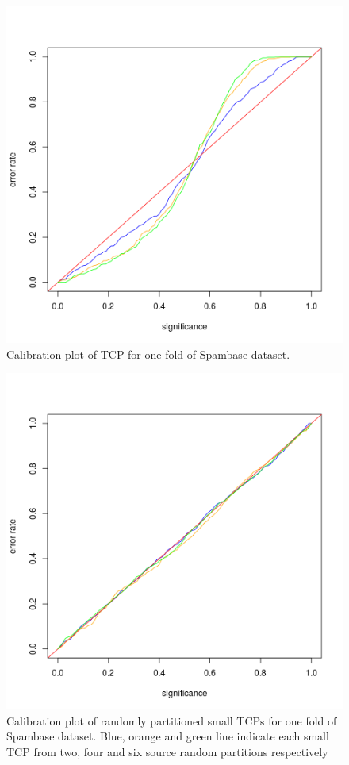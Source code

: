 \documentclass[main]{subfiles}
\begin{document}
\begin{figure}[H]
\begin{center}
  \includegraphics[scale=0.3]{images/eqSourceCombined}
 \caption{Calibration plot of TCP for one fold of Spambase dataset.}
 \label{fig:pooledCalibrationPlot}
\end{center}
\end{figure}

\begin{figure}[H]
\begin{center}
  \includegraphics[scale=0.6]{images/eqSourceInd}
 \caption{Calibration plot of randomly partitioned small TCPs for one fold of  Spambase dataset. Blue, orange and  green line indicate each small TCP from two, four and six source random partitions respectively }\label{fig:valIndividual}
\end{center}
\end{figure}
\end{document}
